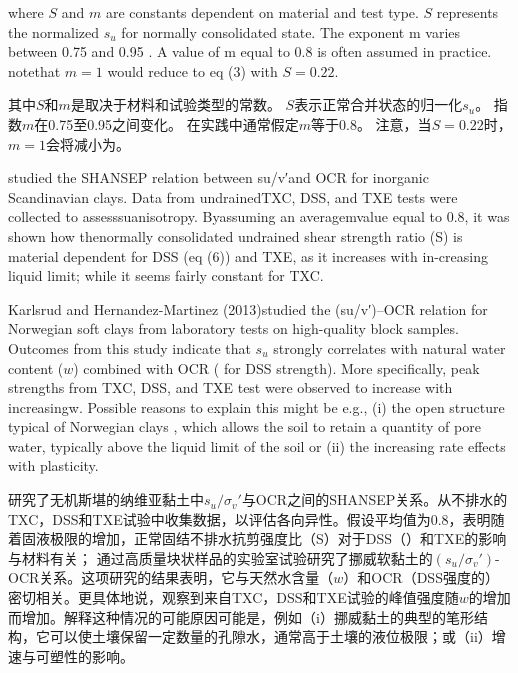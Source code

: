 \begin{ParaColumn}
    \noindent{}where $S$ and $m$ are constants dependent on material and test type. $S$ represents the normalized $s_u$ for normally consolidated state. The exponent m varies between 0.75 and 0.95 \citealp{Jamiolkowski198557}. A value of m equal to 0.8 is often assumed in practice. notethat $m = 1$ would reduce  to eq (3) with $S = 0.22$.

    \switchcolumn

    \noindent{}其中$S$和$m$是取决于材料和试验类型的常数。 $S$表示正常合并状态的归一化$s_u$。 指数$m$在0.75至0.95之间变化\citealp{Jamiolkowski198557}。 在实践中通常假定$m$等于0.8。 注意，当$S=0.22$时，$m = 1$会将减小为。

    \switchcolumn*

    studied the SHANSEP relation between su/v′and OCR for inorganic Scandinavian clays. Data from undrainedTXC, DSS, and TXE tests were collected to assesssuanisotropy. Byassuming an averagemvalue equal to 0.8, it was shown how thenormally consolidated undrained shear strength ratio (S) is material dependent for DSS (eq (6)) and TXE, as it increases with in-creasing liquid limit; while it seems fairly constant for TXC.
    
    Karlsrud and Hernandez-Martinez (2013)studied the (su/v′)–OCR relation for Norwegian soft clays from laboratory tests on high-quality block samples. Outcomes from this study indicate that $s_u$ strongly correlates with natural water content ($w$) combined with OCR ( for DSS strength). More specifically, peak strengths from TXC, DSS, and TXE test were observed to increase with increasingw. Possible reasons to explain this might be e.g., (i) the open structure typical of Norwegian clays \citealp{Rosenqvist1953195,Rosenqvist1966445}, which allows the soil to retain a quantity of pore water, typically above the liquid limit of the soil or (ii) the increasing rate effects with plasticity.

    \switchcolumn

    研究了无机斯堪的纳维亚黏土中$s_u/\sigma_v'$与OCR之间的SHANSEP关系。从不排水的TXC，DSS和TXE试验中收集数据，以评估各向异性。假设平均值为0.8，表明随着固液极限的增加，正常固结不排水抗剪强度比（S）对于DSS（）和TXE的影响与材料有关； \citet{Karlsrud20131273}通过高质量块状样品的实验室试验研究了挪威软黏土的$(s_u/\sigma_v')$-OCR关系。这项研究的结果表明，它与天然水含量（$w$）和OCR（DSS强度的）密切相关。更具体地说，观察到来自TXC，DSS和TXE试验的峰值强度随$w$的增加而增加。解释这种情况的可能原因可能是，例如（i）挪威黏土\citealp{Rosenqvist1953195,Rosenqvist1966445}的典型的笔形结构，它可以使土壤保留一定数量的孔隙水，通常高于土壤的液位极限；或（ii）增速与可塑性的影响。


\end{ParaColumn}
